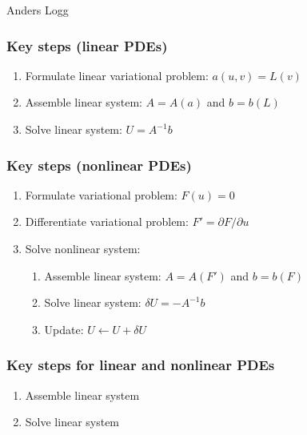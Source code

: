 \documentclass{fenicscourse}
\begin{document}
              {Anders Logg}

\begin{frame}
  \frametitle{Key steps (linear PDEs)}

  \begin{enumerate}\setlength\itemsep{1em}
  \item
    Formulate linear variational problem: $a(u, v) = L(v)$
  \item
    Assemble linear system: $A = A(a)$ and $b = b(L)$
  \item
    Solve linear system: $U = A^{-1} b$
  \end{enumerate}

\end{frame}

\begin{frame}
  \frametitle{Key steps (nonlinear PDEs)}

  \begin{enumerate}\setlength\itemsep{1em}
  \item
    Formulate variational problem: $F(u) = 0$
  \item
    Differentiate variational problem: $F' = \partial F / \partial u$
  \item
    Solve nonlinear system:\\[1em]
    \begin{enumerate}\setlength\itemsep{1em}
    \item
      Assemble linear system: $A = A(F')$ and $b = b(F)$
    \item
      Solve linear system: $\delta U = -A^{-1} b$
    \item
      Update: $U \leftarrow U + \delta U$
    \end{enumerate}
  \end{enumerate}

\end{frame}

\begin{frame}
  \frametitle{Key steps for linear and nonlinear PDEs}

  \begin{enumerate}\setlength\itemsep{1em}
  \item
    Assemble linear system
  \item
    Solve linear system
  \end{enumerate}

\end{frame}
\end{document}
